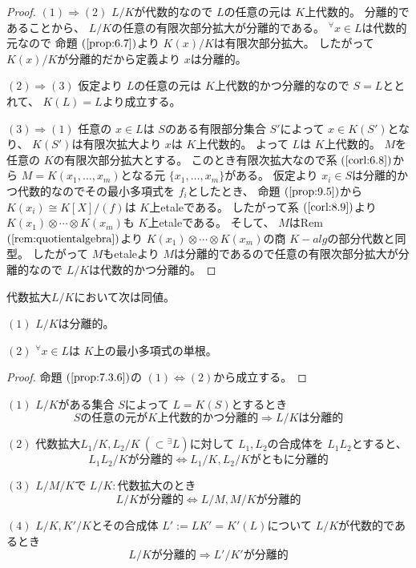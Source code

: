 \documentclass[../master_galois_theory]{subfiles}
\begin{document}
\begin{proof}
  $(1) \Rightarrow (2)$
  $L/K$が代数的なので $L$の任意の元は $K$上代数的。
  分離的であることから、 $L/K$の任意の有限次部分拡大が分離的である。
  ${}^\forall x \in L$は代数的元なので
  命題 $(\mathrm{\ref{prop:6.7}})$より $K(x)/K$は有限次部分拡大。
  したがって $K(x)/K$が分離的だから定義より $x$は分離的。

  $(2) \Rightarrow (3)$
  仮定より $L$の任意の元は $K$上代数的かつ分離的なので
  $S = L$ととれて、 $K(L) = L$より成立する。

  $(3) \Rightarrow (1)$
  任意の $x \in L$は $S$のある有限部分集合 $S'$によって
  $x \in K(S')$となり、 $K(S')$は有限次拡大より $x$は $K$上代数的。
  よって $L$は $K$上代数的。
  $M$を任意の $K$の有限次部分拡大とする。
  このとき有限次拡大なので系 $(\mathrm{\ref{corl:6.8}})$から
  $M = K(x_1 , \dots , x_m)$となる元 $\{ x_1 , \dots , x_m \}$がある。
  仮定より $x_i \in S$は分離的かつ代数的なのでその最小多項式を $f_i$としたとき、
  命題 $(\mathrm{\ref{prop:9.5}})$から
  $K(x_i) \cong K[X]/(f)$は $K$上\rm{etale}である。
  したがって系 $(\mathrm{\ref{corl:8.9}})$より
  $K(x_1) \otimes \cdots \otimes K(x_m)$も $K$上\rm{etale}である。
  そして、 $M$は\rm{Rem} $(\mathrm{\ref{rem:quotientalgebra}})$より
  $K(x_1) \otimes \cdots \otimes K(x_m)$の商 $K-alg$の部分代数と同型。
  したがって $M$も\rm{etale}より $M$は分離的であるので任意の有限次部分拡大が分離的なので
  $L/K$は代数的かつ分離的。
\end{proof}

\begin{corl} \label{corl:separable}
  代数拡大$L/K$において次は同値。

  $(1)$
  $L/K$は分離的。

  $(2)$
  ${}^\forall x \in L$は $K$上の最小多項式の単根。
\end{corl}

\begin{proof}
  命題 $(\mathrm{\ref{prop:7.3.6}})$の $(1) \Leftrightarrow (2)$から成立する。
\end{proof}

\begin{prop}
  $(1)$
  $L/K$がある集合 $S$によって $L = K(S)$とするとき
  \[
    Sの任意の元が K上代数的かつ分離的 \Rightarrow
    L/K は分離的
  \]

  $(2)$
  代数拡大$L_1/K , L_2/K \  (\subset {}^\exists L)$に対して
  $L_1 , L_2$の合成体を $L_1 L_2$とすると、
  \[
  L_1 L_2 / Kが分離的 \Leftrightarrow L_1/K , L_2/Kがともに分離的
  \]

  $(3)$
  $L/M/K$で $L/K:$代数拡大のとき
  \[
  L/Kが分離的 \Leftrightarrow L/M , M/Kが分離的
  \]

  $(4)$
  $L/K , K'/K$とその合成体 $L' := L K' = K'(L)$について
  $L/K$が代数的であるとき
  \[
  L/Kが分離的 \Rightarrow L'/K'が分離的
  \]
\end{prop}
\end{document}
